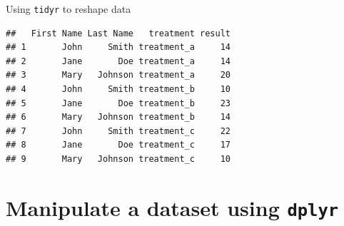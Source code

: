 \documentclass[14pt,ignorenonframetext,]{bredelebeamer}
\newenvironment{Shaded}{\begin{snugshade}}{\end{snugshade}}
\newcommand{\KeywordTok}[1]{\textcolor[rgb]{0.94,0.87,0.69}{#1}}
\newcommand{\DataTypeTok}[1]{\textcolor[rgb]{0.87,0.87,0.75}{#1}}
\newcommand{\DecValTok}[1]{\textcolor[rgb]{0.86,0.86,0.80}{#1}}
\newcommand{\StringTok}[1]{\textcolor[rgb]{0.80,0.58,0.58}{#1}}
\newcommand{\OperatorTok}[1]{\textcolor[rgb]{0.94,0.94,0.82}{#1}}
\newcommand{\NormalTok}[1]{\textcolor[rgb]{0.80,0.80,0.80}{#1}}
\begin{document}
\begin{frame}[fragile]{Using \texttt{tidyr} to reshape data}

\begin{Shaded}
\end{Shaded}

\begin{verbatim}
##   First Name Last Name   treatment result
## 1       John     Smith treatment_a     14
## 2       Jane       Doe treatment_a     14
## 3       Mary   Johnson treatment_a     20
## 4       John     Smith treatment_b     10
## 5       Jane       Doe treatment_b     23
## 6       Mary   Johnson treatment_b     14
## 7       John     Smith treatment_c     22
## 8       Jane       Doe treatment_c     17
## 9       Mary   Johnson treatment_c     10
\end{verbatim}

\end{frame}

\section{\texorpdfstring{Manipulate a dataset using
\texttt{dplyr}}{Manipulate a dataset using dplyr}}\label{manipulate-a-dataset-using-dplyr}
\end{document}
